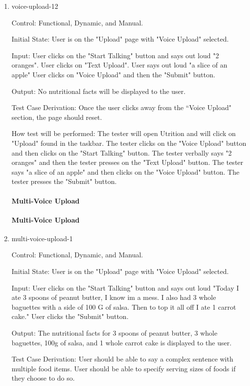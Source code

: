 \documentclass[12pt, titlepage]{article}
\begin{document}
\begin{enumerate}
	\item{voice-upload-12\\}
	
	Control: Functional, Dynamic, and Manual.
	
	Initial State: User is on the "Upload" page with "Voice Upload" selected.
	
	Input: User clicks on the "Start Talking" button and says out loud "2 oranges". User clicks on "Text Upload". User says out loud "a slice of an apple" User clicks on "Voice Upload" and then the "Submit" button.
	
	Output: No nutritional facts will be displayed to the user.
	
	Test Case Derivation: Once the user clicks away from the ``Voice Upload" section, the page should reset.
	
	How test will be performed: The tester will open Utrition and will click on "Upload" found in the taskbar. The tester clicks on the "Voice Upload" button and then clicks on the "Start Talking" button. The tester verbally says "2 oranges" and then the tester presses on the "Text Upload" button. The tester says "a slice of an apple" and then clicks on the "Voice Upload" button. The tester presses the "Submit" button.
		\paragraph{Multi-Voice Upload}
		\paragraph{Multi-Voice Upload}
	\item{multi-voice-upload-1\\}
	
	Control: Functional, Dynamic, and Manual.
	
	Initial State: User is on the "Upload" page with "Voice Upload" selected.
	
	Input: User clicks on the "Start Talking" button and says out loud "Today I ate 3 spoons of peanut butter, I know im a mess. I also had 3 whole baguettes with a side of 100 G of salsa. Then to top it all off I ate 1 carrot cake." User clicks the "Submit" button.
	
	Output: The nutritional facts for 3 spoons of peanut butter, 3 whole baguettes, 100g of salsa, and 1 whole carrot cake is displayed to the user.
	
	Test Case Derivation: User should be able to say a complex sentence with multiple food items. User should be able to specify serving sizes of foods if they choose to do so.
	

\end{enumerate}
\end{document}
